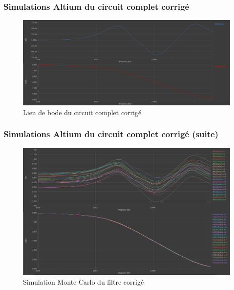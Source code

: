 \documentclass[10pt]{beamer}\usepackage[]{graphicx}\usepackage[]{xcolor}
\begin{document}
\begin{frame}
\frametitle{Simulations Altium du circuit complet corrigé}
\begin{figure}
\centering
\includegraphics[width=.8\textwidth]{figure/altium-bode-complete.png}
\caption{Lieu de bode du circuit complet corrigé}
\label{fig:altium-bode-complete}
\end{figure}
\end{frame}

\begin{frame}
\frametitle{Simulations Altium du circuit complet corrigé (suite)}
\begin{figure}
\centering
\includegraphics[width=.8\textwidth]{figure/altium-monte-carlo-complete.png}
\caption{Simulation Monte Carlo du filtre corrigé}
\label{fig:altium-monte-carlo-complete}
\end{figure}
\end{frame}
\end{document}
